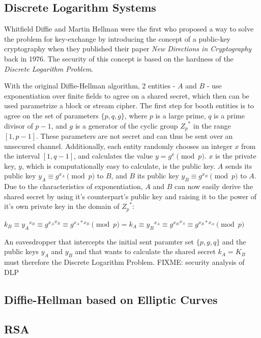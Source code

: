 \subsection{Discrete Logarithm Systems}

Whitfield Diffie and Martin Hellman were the first who proposed a way to solve the problem for key-exchange by introducing the concept of 
a public-key cryptography when they published their paper \textit{New Directions in Cryptography} back in 1976. The security of this concept
is based on the hardness of the \textit{Discrete Logarithm Problem}. 

With the original Diffie-Hellman algorithm, 2 entities - $A$ and $B$ - use exponentiation over finite fields to agree on a shared secret, which
then can be used parametrize a block or stream cipher. The first step for booth entities is to agree on the set of parameters $\{p, q, g\}$, where $p$ is a 
large prime, $q$ is a prime divisor of $p-1$, and $g$ is a generator of the cyclic group ${Z_p}^*$ in the range $[1, p-1]$. These parameters are not secret and
can thus be sent over an unsecured channel.
Additionally, each entity randomly chooses an integer $x$ from the interval $[1, q-1]$, and calculates the value  $y = g^x \pmod p$. $x$ is the private key,
$y$, which is computationally easy to calculate, is the public key. $A$ sends its public key $y_A \equiv g^{x_A} \pmod p$ to $B$, and $B$ its public key
$y_B \equiv g^{x_B} \pmod p$ to $A$. Due to the characteristics of exponentiation, $A$ and $B$ can now easily derive the shared secret by using it's counterpart's
public key and raising it to the power of it's own private key in the domain of ${Z_p}^*$:

$k_B \equiv {y_A}^{x_B} \equiv {g^{x_A}}^{x_B} \equiv g^{x_A*x_B} \pmod p = k_A \equiv {y_B}^{x_A} \equiv g{^{x_B}}^{x_A} \equiv g^{x_B*x_A} \pmod p $

An eavesdropper that intercepts the initial sent paramter set $\{p, g, q\}$ and the public keys $y_A$ and $y_B$ and that wants to calculate the shared secret
$k_A = K_B$  must therefore the Discrete Logarithm Problem. FIXME: security analysis of DLP

\subsection{Diffie-Hellman based on Elliptic Curves}

\subsection{RSA}

